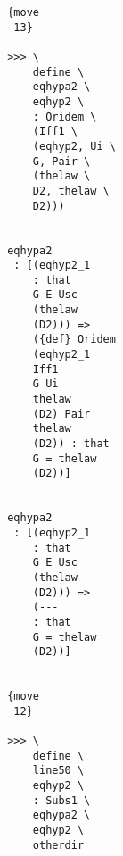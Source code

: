 \documentclass[12pt]{article}
\begin{document}
\begin{verbatim}
                                       {move 
                                        13}

                                       >>> \
                                           define \
                                           eqhypa2 \
                                           eqhyp2 \
                                           : Oridem \
                                           (Iff1 \
                                           (eqhyp2, Ui \
                                           G, Pair \
                                           (thelaw \
                                           D2, thelaw \
                                           D2)))


                                       eqhypa2 
                                        : [(eqhyp2_1 
                                           : that 
                                           G E Usc 
                                           (thelaw 
                                           (D2))) => 
                                           ({def} Oridem 
                                           (eqhyp2_1 
                                           Iff1 
                                           G Ui 
                                           thelaw 
                                           (D2) Pair 
                                           thelaw 
                                           (D2)) : that 
                                           G = thelaw 
                                           (D2))]


                                       eqhypa2 
                                        : [(eqhyp2_1 
                                           : that 
                                           G E Usc 
                                           (thelaw 
                                           (D2))) => 
                                           (--- 
                                           : that 
                                           G = thelaw 
                                           (D2))]


                                       {move 
                                        12}

                                       >>> \
                                           define \
                                           line50 \
                                           eqhyp2 \
                                           : Subs1 \
                                           eqhypa2 \
                                           eqhyp2 \
                                           otherdir



\end{verbatim}
\end{document}
